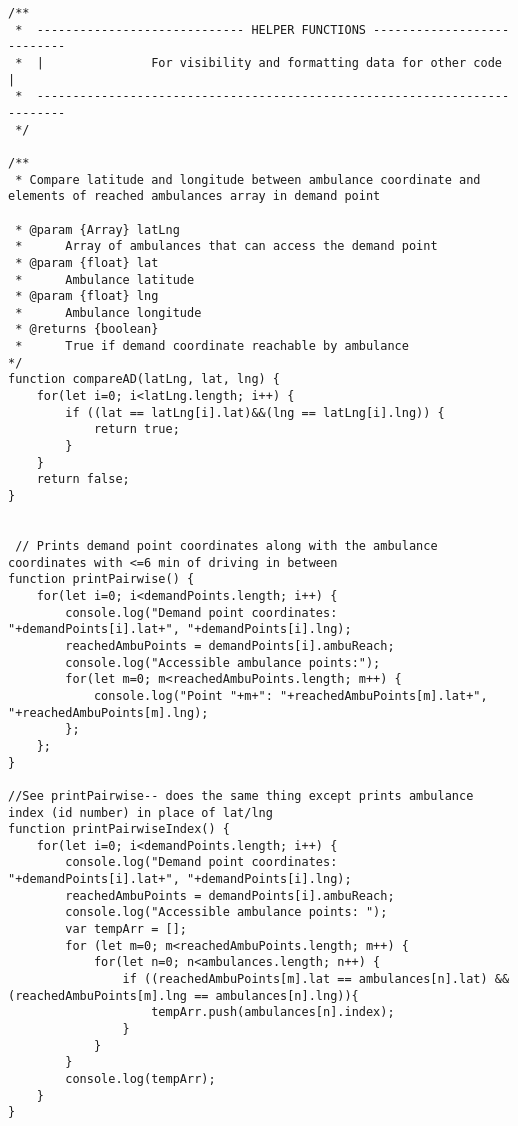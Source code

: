 \documentclass{article}
\newenvironment{code}{\captionsetup{type=listing}}{}
\begin{document}
\begin{code}
\begin{verbatim}
/**
 *  ----------------------------- HELPER FUNCTIONS ---------------------------
 *  |               For visibility and formatting data for other code         |
 *  --------------------------------------------------------------------------
 */

/** 
 * Compare latitude and longitude between ambulance coordinate and elements of reached ambulances array in demand point

 * @param {Array} latLng
 *      Array of ambulances that can access the demand point
 * @param {float} lat
 *      Ambulance latitude
 * @param {float} lng
 *      Ambulance longitude
 * @returns {boolean} 
 *      True if demand coordinate reachable by ambulance
*/ 
function compareAD(latLng, lat, lng) {
    for(let i=0; i<latLng.length; i++) {
        if ((lat == latLng[i].lat)&&(lng == latLng[i].lng)) {
            return true;
        }
    }
    return false;
}


 // Prints demand point coordinates along with the ambulance coordinates with <=6 min of driving in between
function printPairwise() {
    for(let i=0; i<demandPoints.length; i++) {
        console.log("Demand point coordinates: "+demandPoints[i].lat+", "+demandPoints[i].lng);
        reachedAmbuPoints = demandPoints[i].ambuReach;
        console.log("Accessible ambulance points:");
        for(let m=0; m<reachedAmbuPoints.length; m++) {
            console.log("Point "+m+": "+reachedAmbuPoints[m].lat+", "+reachedAmbuPoints[m].lng);
        };
    };
}

//See printPairwise-- does the same thing except prints ambulance index (id number) in place of lat/lng
function printPairwiseIndex() {
    for(let i=0; i<demandPoints.length; i++) {
        console.log("Demand point coordinates: "+demandPoints[i].lat+", "+demandPoints[i].lng);
        reachedAmbuPoints = demandPoints[i].ambuReach;
        console.log("Accessible ambulance points: ");
        var tempArr = [];
        for (let m=0; m<reachedAmbuPoints.length; m++) {
            for(let n=0; n<ambulances.length; n++) {
                if ((reachedAmbuPoints[m].lat == ambulances[n].lat) && (reachedAmbuPoints[m].lng == ambulances[n].lng)){
                    tempArr.push(ambulances[n].index);
                }
            }
        }
        console.log(tempArr);
    }
}


\end{verbatim}
\end{code}
\end{document}
